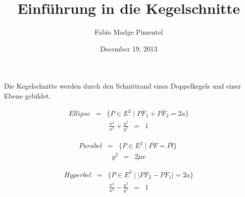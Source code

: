 \documentclass[a4paper]{article}
\title{Einführung in die Kegelschnitte}
\author{Fabio Madge Pimentel}
\date{December 19, 2013}
\begin{document}
\maketitle

Die Kegelschnitte werden durch den Schnittrand eines Doppelkegels und einer Ebene gebildet.

\vspace{4 mm}

\begin{table}[ht]
\begin{minipage}[b]{0.45\linewidth}
\centering

	\centering
		\resizebox{.9\linewidth}{!}{
					
		}

\begin{displaymath}
	\begin{array}{rcl}
		Ellipse  & = & \{P\in E^2\;|\;\overline{{PF}_1} + \overline{{PF}_2} = 2a\}
	\end{array}
\end{displaymath}
\begin{displaymath}
	\begin{array}{rcl}
		\frac{x^2}{a^2} + \frac{y^2}{b^2} &=& 1
	\end{array}
\end{displaymath}
\end{minipage}
\hspace{0.5cm}
\begin{minipage}[b]{0.45\linewidth}
\centering

	\centering
		\resizebox{.9\linewidth}{!}{
					
		}

\begin{displaymath}
	\begin{array}{rcl}
		Parabel  & = & \{P\in E^2\;|\;\overline{PF} = \overline{Pl}\}\
	\end{array}
\end{displaymath}
\begin{displaymath}
	\begin{array}{rcl}
		y^2 &=& 2px
	\end{array}
\end{displaymath}
\end{minipage}
\end{table}

\begin{figure}[h]
	\centering
		\resizebox{.46\linewidth}{!}{
			
		}
\end{figure}
\begin{displaymath}
	\begin{array}{rcl}
		Hyperbel & = & \{P\in E^2\;|\;|\overline{{PF}_2} - \overline{{PF}_1}| = 2a\}
	\end{array}
\end{displaymath}
\begin{displaymath}
	\begin{array}{rcl}
		\frac{x^2}{a^2} - \frac{y^2}{b^2} &=& 1
	\end{array}
\end{displaymath}	
\end{document}
